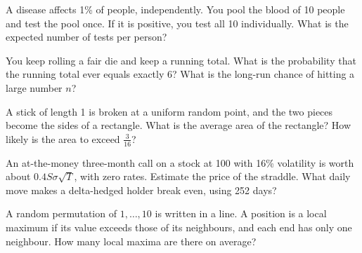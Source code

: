 \begin{question}\label{iq:iv1:timed-test-3:8}
A disease affects 1\% of people, independently. You pool the blood of 10 people and test the pool once. If it is positive, you test all 10 individually. What is the expected number of tests per person?
\end{question}

\begin{question}\label{iq:iv1:timed-test-3:9}
You keep rolling a fair die and keep a running total. What is the probability that the running total ever equals exactly 6? What is the long-run chance of hitting a large number $n$?
\end{question}

\begin{question}\label{iq:iv1:timed-test-3:10}
A stick of length 1 is broken at a uniform random point, and the two pieces become the sides of a rectangle. What is the average area of the rectangle? How likely is the area to exceed $\frac{3}{16}$?
\end{question}

\begin{question}\label{iq:iv1:timed-test-3:11}
An at-the-money three-month call on a stock at 100 with 16\% volatility is worth about $0.4S\sigma\sqrt{T}$, with zero rates. Estimate the price of the straddle. What daily move makes a delta-hedged holder break even, using 252 days?
\end{question}

\begin{question}\label{iq:iv1:timed-test-3:12}
A random permutation of $1, \dots, 10$ is written in a line. A position is a local maximum if its value exceeds those of its neighbours, and each end has only one neighbour. How many local maxima are there on average?
\end{question}
